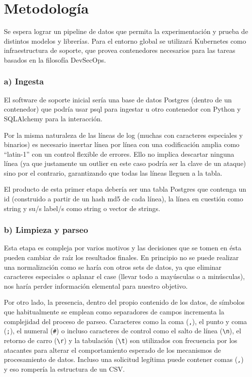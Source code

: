 \documentclass[12pt]{article}
\begin{document}
\section{Metodología}
\label{sec:metodologia}
Se espera lograr un pipeline de datos que permita la experimentación y prueba de distintos modelos y librerías. Para el entorno global se utilizará Kubernetes como infraestructura de soporte, que provea contenedores necesarios para las tareas basados en la filosofía DevSecOps. 

\subsubsection*{a) Ingesta}
El software de soporte inicial sería una base de datos Postgres (dentro de un contenedor) que podría usar psql para ingestar u otro contenedor con Python y SQLAlchemy para la interacción.

Por la misma naturaleza de las líneas de log (muchas con caracteres especiales y binarios) es necesario insertar línea por línea con una codificación amplia como \enquote{latin-1} con un control flexible de errores. Ello no implica descartar ninguna línea (ya que justamente un outlier en este caso podría ser la clave de un ataque) sino por el contrario, garantizando que todas las líneas lleguen a la tabla.

El producto de esta primer etapa debería ser una tabla Postgres que contenga un id (construido a partir de un hash md5 de cada línea), la línea en cuestión como string y su/s label/s como string o vector de strings.


\subsubsection*{b) Limpieza y parseo}
Esta etapa es compleja por varios motivos y las decisiones que se tomen en ésta pueden cambiar de raíz los resultados finales. En principio no se puede realizar una normalización como se haría con otros sets de datos, ya que eliminar caracteres especiales o aplanar el case (llevar todo a mayúsculas o a minúsculas), nos haría perder información elemental para nuestro objetivo.

Por otro lado, la presencia, dentro del propio contenido de los datos, de símbolos que habitualmente se emplean como separadores de campos incrementa la complejidad del proceso de parseo. Caracteres como la coma (\texttt{,}), el punto y coma (\texttt{;}), el numeral (\texttt{\#}) o incluso caracteres de control como el salto de línea (\texttt{\textbackslash n}), el retorno de carro (\texttt{\textbackslash r}) y la tabulación (\texttt{\textbackslash t}) son utilizados con frecuencia por los atacantes para alterar el comportamiento esperado de los mecanismos de procesamiento de datos. Incluso una solicitud legítima puede contener comas (\texttt{,}) y eso rompería la estructura de un CSV.
\end{document}
